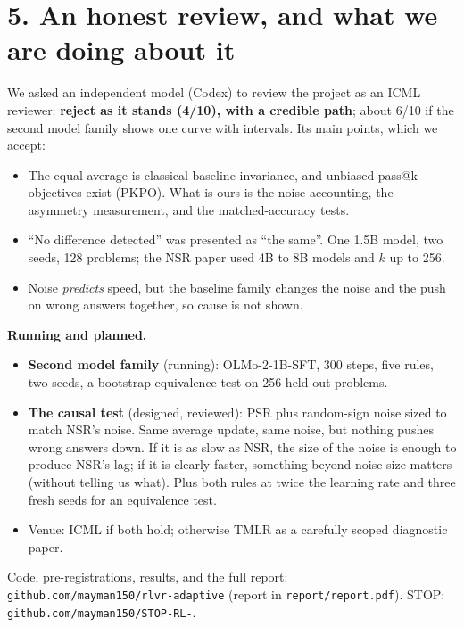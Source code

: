 \documentclass[11pt]{article}
\begin{document}
\section*{5. An honest review, and what we are doing about it}
We asked an independent model (Codex) to review the project as an ICML reviewer: \textbf{reject as it stands (4/10), with a credible path}; about 6/10 if the second model family shows one curve with intervals. Its main points, which we accept:
\begin{itemize}[leftmargin=*,itemsep=1pt]
\item The equal average is classical baseline invariance, and unbiased pass@k objectives exist (PKPO). What is ours is the noise accounting, the asymmetry measurement, and the matched-accuracy tests.
\item ``No difference detected'' was presented as ``the same''. One 1.5B model, two seeds, 128 problems; the NSR paper used 4B to 8B models and $k$ up to 256.
\item Noise \emph{predicts} speed, but the baseline family changes the noise and the push on wrong answers together, so cause is not shown.
\end{itemize}
\textbf{Running and planned.}
\begin{itemize}[leftmargin=*,itemsep=1pt]
\item \textbf{Second model family} (running): OLMo-2-1B-SFT, 300 steps, five rules, two seeds, a bootstrap equivalence test on 256 held-out problems.
\item \textbf{The causal test} (designed, reviewed): PSR plus random-sign noise sized to match NSR's noise. Same average update, same noise, but nothing pushes wrong answers down. If it is as slow as NSR, the size of the noise is enough to produce NSR's lag; if it is clearly faster, something beyond noise size matters (without telling us what). Plus both rules at twice the learning rate and three fresh seeds for an equivalence test.
\item Venue: ICML if both hold; otherwise TMLR as a carefully scoped diagnostic paper.
\end{itemize}

\vspace{4pt}
{\small Code, pre-registrations, results, and the full report: \texttt{github.com/mayman150/rlvr-adaptive} (report in \texttt{report/report.pdf}). STOP: \texttt{github.com/mayman150/STOP-RL-}.}
\end{document}
